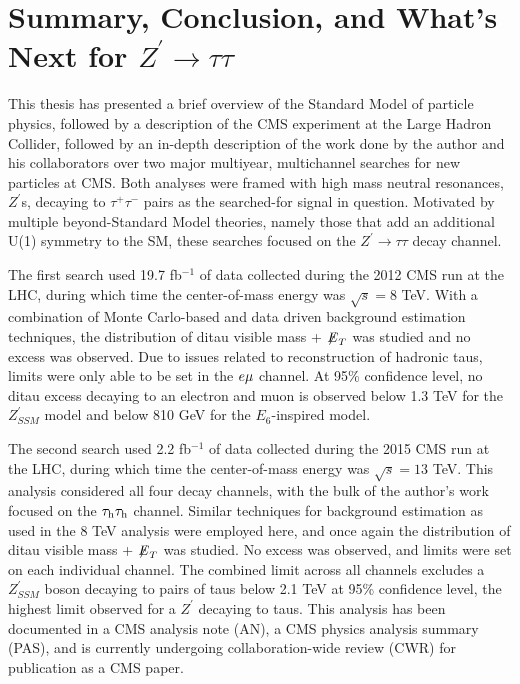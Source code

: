 \chapter{Summary, Conclusion, and What's Next for $Z^\prime\to\tau\tau$}

This thesis has presented a brief overview of the Standard Model of particle physics, followed by a description of the CMS experiment at the Large Hadron Collider, followed by an in-depth description of the work done by the author and his collaborators over two major multiyear, multichannel searches for new particles at CMS. Both analyses were framed with high mass neutral resonances, $Z^\prime$s, decaying to $\tau^+\tau^-$ pairs as the searched-for signal in question. Motivated by multiple beyond-Standard Model theories, namely those that add an additional U(1) symmetry to the SM, these searches focused on the $Z^\prime\to\tau\tau$ decay channel. 

The first search used 19.7 fb$^{-1}$ of data collected during the 2012 CMS run at the LHC, during which time the center-of-mass energy was $\sqrt{s} = 8$ TeV. With a combination of Monte Carlo-based and data driven background estimation techniques, the distribution of ditau visible mass + ${\not\mathrel{E}}_T$ was studied and no excess was observed. Due to issues related to reconstruction of hadronic taus, limits were only able to be set in the $e\mu$ channel. At 95\% confidence level, no ditau excess decaying to an electron and muon is observed below 1.3 TeV for the $Z^\prime_{SSM}$ model and below 810 GeV for the $E_6$-inspired model.

The second search used 2.2 fb$^{-1}$ of data collected during the 2015 CMS run at the LHC, during which time the center-of-mass energy was $\sqrt{s} = 13$ TeV. This analysis considered all four decay channels, with the bulk of the author's work focused on the $\tau_{\textrm{h}}\tau_{\textrm{h}}$ channel. Similar techniques for background estimation as used in the 8 TeV analysis were employed here, and once again the distribution of ditau visible mass + ${\not\mathrel{E}}_T$ was studied. No excess was observed, and limits were set on each individual channel. The combined limit across all channels excludes a $Z^\prime_{SSM}$ boson decaying to pairs of taus below 2.1 TeV at 95\% confidence level, the highest limit observed for a $Z^\prime$ decaying to taus. This analysis has been documented in a CMS analysis note (AN), a CMS physics analysis summary (PAS), and is currently undergoing collaboration-wide review (CWR) for publication as a CMS paper.

